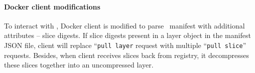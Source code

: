 \paragraph{Docker client modifications}
 
To interact with \sysname, Docker client is modified to 
parse \sysname~manifest with additional attributes -- slice digests.
If slice digests present in a layer object in the manifest JSON file, 
client will replace ``\texttt{pull layer} request with multiple ``\texttt{pull slice}'' requests.
Besides, when client receives slices back from registry, 
it decompresses these slices together into an uncompressed layer.  






